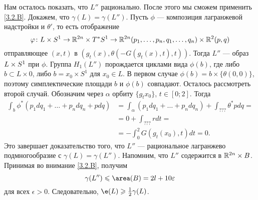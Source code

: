 Нам осталось показать, что $L''$ рационально.
После этого мы сможем применить \ref{3.2.B}.
Докажем, что $\gamma (L) = \gamma (L'')$.
Пусть $\phi$ --- композиция лагранжевой надстройки и $\theta'$,
то есть отображение 
\[\varphi\colon 
L \times S^1
\to
\mathbb{R}^{2n} \times T^\ast S^1
\to
\mathbb{R}^{2n} (p_1,\dots, p_n, q_1,\dots, q_n) \times \mathbb{R}^2 (p, q)\]
отправляющее $(x, t)$ в $(g_t (x), \theta (-G (g_t (x), t), t))$.
Тогда $L''$ --- образ $L \z\times S^1$ при $\phi$.
Группа $H_1 (L'')$ порождается циклами вида $\phi (b)$, где либо $b \subset L \times {0}$, либо $b = {x_0} \times S^1$ для $x_0 \in L$.
В первом случае $\phi (b) = b \times \{\theta (0, 0)\}$, поэтому симплектические площади $b$ и $\phi (b)$ совпадают.
Осталось рассмотреть второй случай.
Обозначим через $\alpha$ орбиту $\{g_t x_0\}$, $t \in [0; 2]$.
Тогда
\begin{align*}
\int_b\phi^\ast (p_1 dq_1 +\dots
+ p_n dq_n + pdq)
&= \int_\alpha (p_1 dq_1 +\dots
+ p_n dq_n) + \int_{???}\theta^\ast pdq =
\\
&= 0 + \int_{???} rdt =
\\
&= - \int_0^2G (g_t (x_0), t) dt 
= 0.
\end{align*}
Это завершает доказательство того, что $L''$ --- рациональное лагранжево подмногообразие с $\gamma (L) = \gamma (L'')$.
Напомним, что $L''$ содержится в $\mathbb{R}^{2n} \times B$.
Принимая во внимание \ref{3.2.B}, получим 
\[\gamma (L'') \le \area (B) = 2l + 10\epsilon\]
для всех $\epsilon> 0$.
Следовательно, $\e(L) \ge \tfrac12 \gamma (L)$.
\qeds
